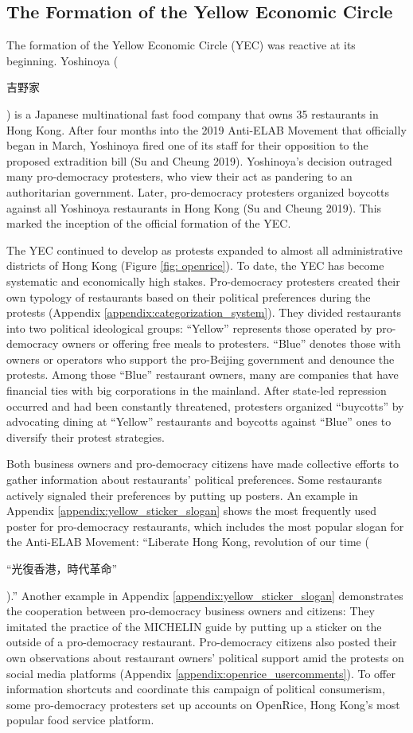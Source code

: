 \documentclass[letterpaper, 12pt]{article}
\begin{document}
\subsection{The Formation of the Yellow Economic Circle}
The formation of the Yellow Economic Circle (YEC) was reactive at its beginning. Yoshinoya (\begin{CJK*}{UTF8}{bkai}吉野家\end{CJK*}) is a Japanese multinational fast food company that owns 35 restaurants in Hong Kong. After four months into the 2019 Anti-ELAB Movement that officially began in March, Yoshinoya fired one of its staff for their opposition to the proposed extradition bill (Su and Cheung 2019). Yoshinoya's decision outraged many pro-democracy protesters, who view their act as pandering to an authoritarian government. Later, pro-democracy protesters organized boycotts against all Yoshinoya restaurants in Hong Kong (Su and Cheung 2019). This marked the inception of the official formation of the YEC. 

The YEC continued to develop as protests expanded to almost all administrative districts of Hong Kong (Figure \ref{fig: openrice}). To date, the YEC has become systematic and economically high stakes. Pro-democracy protesters created their own typology of restaurants based on their political preferences during the protests (Appendix \ref{appendix:categorization_system}). They divided restaurants into two political ideological groups: ``Yellow'' represents those operated by pro-democracy owners or offering free meals to protesters. ``Blue'' denotes those with owners or operators who support the pro-Beijing government and denounce the protests. Among those ``Blue'' restaurant owners, many are companies that have financial ties with big corporations in the mainland. After state-led repression occurred and had been constantly threatened, protesters organized ``buycotts'' by advocating dining at ``Yellow'' restaurants and boycotts against ``Blue'' ones to diversify their protest strategies. 

Both business owners and pro-democracy citizens have made collective efforts to gather information about restaurants' political preferences. Some restaurants actively signaled their preferences by putting up posters. An example in Appendix \ref{appendix:yellow_sticker_slogan} shows the most frequently used poster for pro-democracy restaurants, which includes the most popular slogan for the Anti-ELAB Movement: ``Liberate Hong Kong, revolution of our time (\begin{CJK*}{UTF8}{bkai}``光復香港，時代革命''\end{CJK*}).'' Another example in Appendix \ref{appendix:yellow_sticker_slogan} demonstrates the cooperation between pro-democracy business owners and citizens: They imitated the practice of the MICHELIN guide by putting up a sticker on the outside of a pro-democracy restaurant. Pro-democracy citizens also posted their own observations about restaurant owners' political support amid the protests on social media platforms (Appendix \ref{appendix:openrice_usercomments}). To offer information shortcuts and coordinate this campaign of political consumerism, some pro-democracy protesters set up accounts on OpenRice, Hong Kong's most popular food service platform.
\end{document}

